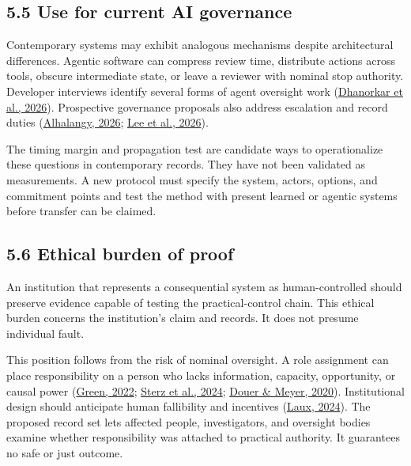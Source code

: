\documentclass[11pt]{article}
\begin{document}
\subsection*{5.5 Use for current AI governance}

Contemporary systems may exhibit analogous mechanisms despite architectural differences. Agentic software can compress review time, distribute actions across tools, obscure intermediate state, or leave a reviewer with nominal stop authority. Developer interviews identify several forms of agent oversight work (\href{https://doi.org/10.1145/3805689.3812402}{Dhanorkar et al., 2026}). Prospective governance proposals also address escalation and record duties (\href{https://doi.org/10.3390/info17070694}{Alhalangy, 2026}; \href{https://doi.org/10.3390/systems14070849}{Lee et al., 2026}).

The timing margin and propagation test are candidate ways to operationalize these questions in contemporary records. They have not been validated as measurements. A new protocol must specify the system, actors, options, and commitment points and test the method with present learned or agentic systems before transfer can be claimed.

\subsection*{5.6 Ethical burden of proof}

An institution that represents a consequential system as human-controlled should preserve evidence capable of testing the practical-control chain. This ethical burden concerns the institution's claim and records. It does not presume individual fault.

This position follows from the risk of nominal oversight. A role assignment can place responsibility on a person who lacks information, capacity, opportunity, or causal power (\href{https://doi.org/10.1016/j.clsr.2022.105681}{Green, 2022}; \href{https://doi.org/10.1145/3630106.3659051}{Sterz et al., 2024}; \href{https://doi.org/10.1109/TASE.2020.2965466}{Douer \& Meyer, 2020}). Institutional design should anticipate human fallibility and incentives (\href{https://doi.org/10.1007/s00146-023-01777-z}{Laux, 2024}). The proposed record set lets affected people, investigators, and oversight bodies examine whether responsibility was attached to practical authority. It guarantees no safe or just outcome.
\end{document}
